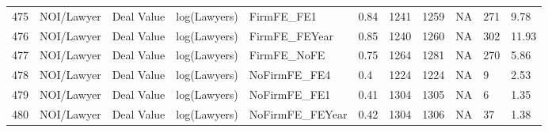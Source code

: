 \documentclass{article}
\begin{document}
\begin{table}[H]
\begin{tabular}{rllllllllll}
  475 & NOI/Lawyer & Deal Value & log(Lawyers) & FirmFE\_FE1 & 0.84 & 1241 & 1259 & NA & 271 & 9.78 \\
  476 & NOI/Lawyer & Deal Value & log(Lawyers) & FirmFE\_FEYear & 0.85 & 1240 & 1260 & NA & 302 & 11.93 \\
  477 & NOI/Lawyer & Deal Value & log(Lawyers) & FirmFE\_NoFE & 0.75 & 1264 & 1281 & NA & 270 & 5.86 \\
  478 & NOI/Lawyer & Deal Value & log(Lawyers) & NoFirmFE\_FE4 & 0.4 & 1224 & 1224 & NA & 9 & 2.53 \\
  479 & NOI/Lawyer & Deal Value & log(Lawyers) & NoFirmFE\_FE1 & 0.41 & 1304 & 1305 & NA & 6 & 1.35 \\
  480 & NOI/Lawyer & Deal Value & log(Lawyers) & NoFirmFE\_FEYear & 0.42 & 1304 & 1306 & NA & 37 & 1.38 \\
   \hline
\end{tabular}
\end{table}
\end{document}
